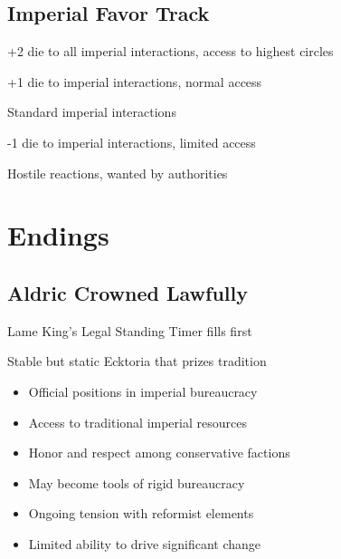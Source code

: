 \documentclass[11pt]{article}
\newenvironment{mechanics}{\begin{description}[leftmargin=*,style=standard]}{\end{description}}
\newenvironment{ending}[1]{\begin{description}[leftmargin=*,style=standard]\item[\textbf{#1}]}{\end{description}}
\begin{document}
\subsection{Imperial Favor Track}
\begin{mechanics}
\item[Exalted:] +2 die to all imperial interactions, access to highest circles
\item[Respected:] +1 die to imperial interactions, normal access
\item[Neutral:] Standard imperial interactions
\item[Suspect:] -1 die to imperial interactions, limited access
\item[Enemy:] Hostile reactions, wanted by authorities
\end{mechanics}

\section{Endings}

\subsection{Aldric Crowned Lawfully}
\begin{ending}{Aldric Crowned Lawfully}
\item[Conditions:] Lame King's Legal Standing Timer fills first
\item[Outcome:] Stable but static Ecktoria that prizes tradition
\item[Rewards:] 
  \begin{itemize}
    \item Official positions in imperial bureaucracy
    \item Access to traditional imperial resources
    \item Honor and respect among conservative factions
  \end{itemize}
\item[Consequences:] 
  \begin{itemize}
    \item May become tools of rigid bureaucracy
    \item Ongoing tension with reformist elements
    \item Limited ability to drive significant change
  \end{itemize}
\end{ending}
\end{document}
